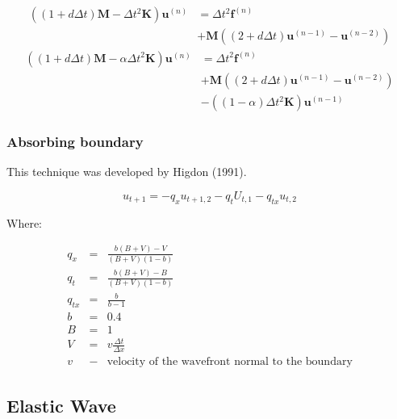 \documentclass[a4paper,10pt]{book}
\begin{document}
    \begin{equation}
    \begin{split}
    \left(
        \left(1+d\Delta t\right)\mathbf{M}-\Delta t^2\mathbf{K}
    \right)\mathbf{u}^{(n)}&=
    \Delta t^2\mathbf{f}^{(n)}\\&+\mathbf{M}
    \left(
        \left(2+d\Delta t\right)\mathbf{u}^{(n-1)}-\mathbf{u}^{(n-2)}
    \right)
    \end{split}
    \end{equation}
    \begin{equation}
    \begin{split}
    \left(
        \left(1+d\Delta t\right)\mathbf{M}-\alpha\Delta t^2\mathbf{K}
    \right)\mathbf{u}^{(n)}&=
    \Delta t^2\mathbf{f}^{(n)}\\&+\mathbf{M}
    \left(
        \left(2+d\Delta t\right)\mathbf{u}^{(n-1)}-\mathbf{u}^{(n-2)}
    \right)\\
    &-\left(
        \left(1-\alpha\right)\Delta t^2\mathbf{K}
    \right)\mathbf{u}^{(n-1)}
    \end{split}
    \end{equation}

\subsubsection{Absorbing boundary}

    This technique was developed by Higdon (1991).

    \begin{equation}
    u_{t+1}=-q_xu_{t+1,2}-q_tU_{t,1}-q_{tx}u_{t,2}
    \end{equation}

    Where:

    \begin{eqnarray*}
    q_x&=&\frac{b\left(B+V\right)-V}{\left(B+V\right)\left(1-b\right)}\\
    q_t&=&\frac{b\left(B+V\right)-B}{\left(B+V\right)\left(1-b\right)}\\
    q_{tx}&=&\frac{b}{b-1}\\
    b&=&0.4\\
    B&=&1\\
    V&=&v\frac{\Delta t}{\Delta x}\\
    v&-&\text{velocity of the wavefront normal to the boundary}
    \end{eqnarray*}

\subsection{Elastic Wave}
\end{document}

